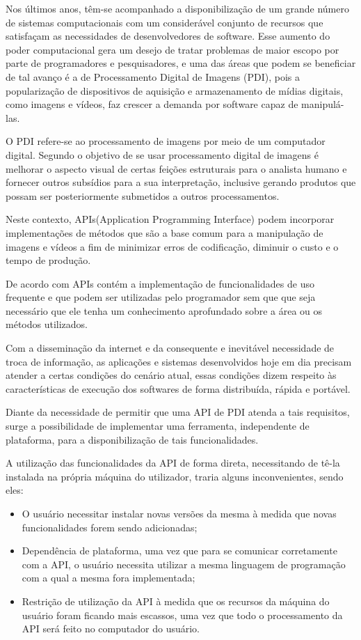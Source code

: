 \documentclass[12pt]{article}
\begin{document}
Nos últimos anos, têm-se acompanhado a disponibilização de um grande número de sistemas 
computacionais com um considerável conjunto de recursos que satisfaçam as necessidades de 
desenvolvedores de software. Esse aumento do poder computacional gera um desejo de tratar 
problemas de maior escopo por parte de programadores e pesquisadores, e uma das áreas que podem 
se beneficiar de tal avanço é a de Processamento Digital de Imagens (PDI), pois a popularização 
de dispositivos de aquisição e armazenamento de mídias digitais, como imagens e vídeos, faz 
crescer a demanda por software capaz de manipulá-las.

O PDI refere-se ao processamento de imagens por meio de um computador digital. Segundo \cite{spring} o objetivo de se usar processamento digital de imagens é melhorar o aspecto visual de certas feições estruturais para o analista humano e fornecer outros subsídios para a sua interpretação, inclusive gerando produtos que possam ser posteriormente submetidos a outros processamentos. 

Neste contexto, APIs(Application Programming Interface) podem incorporar implementações de métodos que são a base comum para a manipulação de imagens e 
vídeos a fim de minimizar erros de codificação, diminuir o custo e o tempo de produção. 

De acordo com \cite{pressman:16, sommerville:11} APIs contém a implementação de funcionalidades de uso frequente e que podem ser utilizadas pelo
programador sem que que seja necessário que ele tenha um conhecimento aprofundado sobre a área ou os métodos utilizados.

Com a disseminação da internet e da consequente e inevitável necessidade de troca de informação, 
as aplicações e sistemas desenvolvidos hoje em dia precisam 
atender a certas condições do cenário atual, essas condições dizem respeito às características 
de execução dos softwares de forma distribuída, rápida e portável. 

Diante da necessidade de permitir que uma API de PDI atenda a tais requisitos, surge a
possibilidade de implementar uma ferramenta, independente de plataforma, para a
disponibilização de tais funcionalidades. 

A utilização das funcionalidades da API de forma direta, necessitando de tê-la instalada na própria máquina do utilizador, traria alguns inconvenientes, sendo eles:

\begin{itemize}
	\item O usuário necessitar instalar novas versões da mesma à medida que novas funcionalidades forem sendo adicionadas;
	\item Dependência de plataforma, uma vez que para se comunicar corretamente com a API, o usuário necessita utilizar a mesma linguagem de programação com a qual a mesma fora implementada;
	\item Restrição de utilização da API à medida que os recursos da máquina do usuário foram ficando mais escassos, uma vez que todo o processamento da API será feito no computador do usuário.
\end{itemize}
\end{document}

